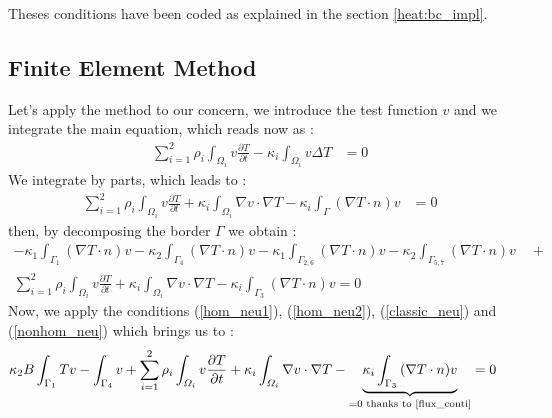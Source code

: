 \noindent Theses conditions have been coded as explained in the section \ref{heat:bc_impl}.

\subsection{Finite Element Method}
Let's apply the method to our concern, we introduce the test function $v$ and we integrate the main equation, which reads now as :
\begin{equation}
   \begin{split}
      \displaystyle{\sum_{i=1}^{2} \rho_i \int_{\varOmega_i} v\frac{ \partial T}{\partial t} - \kappa_i \int_{\varOmega_i} v\Delta T }  & = 0  
  \end{split}
\end{equation}
We integrate by parts, which leads to :
\begin{equation}
   \begin{split}
      \displaystyle{\sum_{i=1}^{2} \rho_i \int_{\varOmega_i} v\frac{ \partial T}{\partial t} +  \kappa_i \int_{\varOmega_i} {\nabla v \cdot \nabla T} - \kappa_i \int_\Gamma {(\nabla T \cdot n) v} }  & = 0
  \end{split}
\end{equation}
then, by decomposing the border $\Gamma$ we obtain :
\begin{multline}
 \displaystyle{- \kappa_1 \int_{\Gamma_1}{(\nabla T \cdot n) v} - \kappa_2 \int_{\Gamma_4} {(\nabla T \cdot n) v} - \kappa_1 \int_{\Gamma_{2,6}}{(\nabla T \cdot n) v}  - \kappa_2 \int_{\Gamma_{5,7}}{(\nabla T \cdot n) v} } \quad + \\ \displaystyle{ \sum_{i=1}^{2}  \rho_i \int_{\varOmega_i} v\frac{ \partial T}{\partial t} + \kappa_i \int_{\varOmega_i} {\nabla v \cdot \nabla T} - \kappa_i \int_{\Gamma_3}{(\nabla T \cdot n) v}  } =   0 
\end{multline}
Now, we apply the conditions (\ref{hom_neu1}), (\ref{hom_neu2}), (\ref{classic_neu}) and (\ref{nonhom_neu}) which brings us to :
\begin{equation}
   \begin{split}
 \displaystyle{ \kappa_2 B \int_{\Gamma_1}{T v} - \int_{\Gamma_4} {v} + \sum_{i=1}^{2}  \rho_i \int_{\varOmega_i} v\frac{ \partial T}{\partial t} + \kappa_i \int_{\varOmega_i} {\nabla v \cdot \nabla T}  - \underbrace{\kappa_i \int_{\Gamma_3}{(\nabla T \cdot n) v}}_{\text{=0 thanks to \ref{flux_conti}}}  } & =   0 
  \end{split}
\end{equation}

